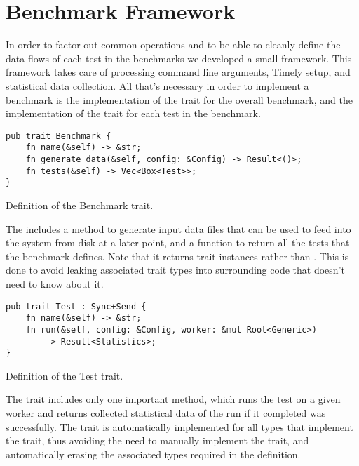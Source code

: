 \section{Benchmark Framework}
In order to factor out common operations and to be able to cleanly define the data flows of each test in the benchmarks we developed a small framework. This framework takes care of processing command line arguments, Timely setup, and statistical data collection. All that's necessary in order to implement a benchmark is the implementation of the  trait for the overall benchmark, and the implementation of the  trait for each test in the benchmark.

\begin{listing}[H]
\begin{verbatim}
pub trait Benchmark {
    fn name(&self) -> &str;
    fn generate_data(&self, config: &Config) -> Result<()>;
    fn tests(&self) -> Vec<Box<Test>>;
}
\end{verbatim}
  \caption{Definition of the Benchmark trait.}
  \label{lst:benchmark-trait}
\end{listing}

The  includes a method to generate input data files that can be used to feed into the system from disk at a later point, and a function to return all the tests that the benchmark defines. Note that it returns  trait instances rather than . This is done to avoid leaking associated trait types into surrounding code that doesn't need to know about it.

\begin{listing}[H]
\begin{verbatim}
pub trait Test : Sync+Send {
    fn name(&self) -> &str;
    fn run(&self, config: &Config, worker: &mut Root<Generic>)
        -> Result<Statistics>;
}
\end{verbatim}
  \caption{Definition of the Test trait.}
  \label{lst:test-trait}
\end{listing}

The  trait includes only one important method, which runs the test on a given worker and returns collected statistical data of the run if it completed was successfully. The  trait is automatically implemented for all types that implement the  trait, thus avoiding the need to manually implement the  trait, and automatically erasing the associated types required in the  definition.

